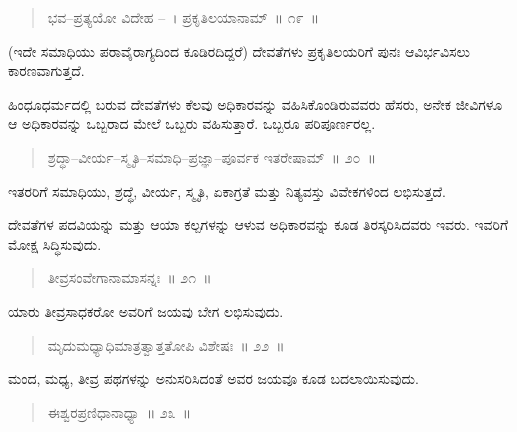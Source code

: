 \vspace{-0.3cm}

\begin{verse}
ಭವ–ಪ್ರತ್ಯಯೋ ವಿದೇಹ –~। ಪ್ರಕೃತಿಲಯಾನಾಮ್​~॥ ೧೯~॥
\end{verse}

\vspace{-0.3cm}

(ಇದೇ ಸಮಾಧಿಯು ಪರಾವೈರಾಗ್ಯದಿಂದ ಕೂಡಿರದಿದ್ದರೆ) ದೇವತೆಗಳು ಪ್ರಕೃತಿಲಯರಿಗೆ ಪುನಃ ಆವಿರ್ಭವಿಸಲು ಕಾರಣವಾಗುತ್ತದೆ. 

ಹಿಂಧೂಧರ್ಮದಲ್ಲಿ ಬರುವ ದೇವತೆಗಳು ಕೆಲವು ಅಧಿಕಾರವನ್ನು ವಹಿಸಿಕೊಂಡಿರುವ\break ವರು ಹೆಸರು, ಅನೇಕ ಜೀವಿಗಳೂ ಆ ಅಧಿಕಾರವನ್ನು ಒಬ್ಬರಾದ ಮೇಲೆ ಒಬ್ಬರು ವಹಿಸುತ್ತಾರೆ. ಒಬ್ಬರೂ ಪರಿಪೂರ್ಣರಲ್ಲ. 

\vspace{-0.3cm}

\begin{verse}
ಶ್ರದ್ಧಾ–ವೀರ್ಯ–ಸ್ಮೃತಿ–ಸಮಾಧಿ–ಪ್ರಜ್ಞಾ–ಪೂರ್ವಕ ಇತರೇಷಾಮ್​~॥ ೨೦~॥
\end{verse}

\vspace{-0.3cm}

ಇತರರಿಗೆ ಸಮಾಧಿಯು, ಶ್ರದ್ಧೆ, ವೀರ್ಯ, ಸ್ಮೃತಿ, ಏಕಾಗ್ರತೆ ಮತ್ತು ನಿತ್ಯವಸ್ತು ವಿವೇಕಗಳಿಂದ ಲಭಿಸುತ್ತದೆ. 

ದೇವತೆಗಳ ಪದವಿಯನ್ನು ಮತ್ತು ಆಯಾ ಕಲ್ಪಗಳನ್ನು ಆಳುವ ಅಧಿಕಾರವನ್ನು ಕೂಡ ತಿರಸ್ಕರಿಸಿದವರು ಇವರು. ಇವರಿಗೆ ಮೋಕ್ಷ ಸಿದ್ಧಿಸುವುದು. 

\vspace{-0.3cm}

\begin{verse}
ತೀವ್ರಸಂವೇಗಾನಾಮಾಸನ್ನಃ~॥ ೨೧~॥
\end{verse}

\vspace{-0.3cm}

ಯಾರು ತೀವ್ರಸಾಧಕರೋ ಅವರಿಗೆ ಜಯವು ಬೇಗ ಲಭಿಸುವುದು. 

\vspace{-0.3cm}

\begin{verse}
ಮೃದುಮಧ್ಯಾಧಿಮಾತ್ರತ್ವಾತ್ತತೋಪಿ ವಿಶೇಷಃ~॥ ೨೨~॥
\end{verse}

\vspace{-0.3cm}

ಮಂದ, ಮಧ್ಯ, ತೀವ್ರ ಪಥಗಳನ್ನು ಅನುಸರಿಸಿದಂತೆ ಅವರ ಜಯವೂ ಕೂಡ ಬದಲಾಯಿಸುವುದು. 

\vspace{-0.3cm}

\begin{verse}
ಈಶ್ವರಪ್ರಣಿಧಾನಾಧ್ಯಾ~॥ ೨೩~॥
\end{verse}

